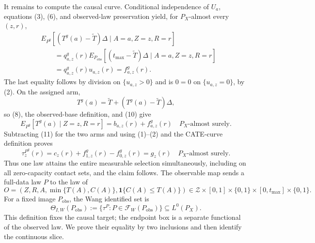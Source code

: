 It remains to compute the causal curve.  Conditional independence of \(U_a\), equations (3), (6), and observed-law preservation yield, for \(P_X\)-almost every \((z,r)\),
\[
\begin{aligned}
&E_{P^g}\!\left[(T^g(a)-\widetilde T)\Delta
\mid A=a,Z=z,R=r\right]\\
&\qquad=q^g_{a,z}(r)
E_{P_{\mathrm{obs}}}\!\left[(t_{\max}-\widetilde T)\Delta
\mid A=a,Z=z,R=r\right]\\
&\qquad=q^g_{a,z}(r)u_{a,z}(r)
=f^g_{a,z}(r).
\end{aligned}
\tag{10}
\]
The last equality follows by division on \(\{u_{a,z}>0\}\) and is \(0=0\) on \(\{u_{a,z}=0\}\), by (2).  On the assigned arm,
\[
T^g(a)=\widetilde T+(T^g(a)-\widetilde T)\Delta,
\]
so (8), the observed-base definition, and (10) give
\[
E_{P^g}[T^g(a)\mid Z=z,R=r]
=b_{a,z}(r)+f^g_{a,z}(r)
\quad P_X\text{-almost surely}.
\tag{11}
\]
Subtracting (11) for the two arms and using (1)--(2) and the CATE-curve definition proves
\[
\tau_z^{P^g}(r)
=c_z(r)+f^g_{1,z}(r)-f^g_{0,z}(r)
=g_z(r)
\quad P_X\text{-almost surely}.
\tag{12}
\]
Thus one law attains the entire measurable selection simultaneously, including on all zero-capacity contact sets, and the claim follows.
The observable map sends a full-data law \(P\) to the law of
\[
O=(Z,R,A,\min\{T(A),C(A)\},\mathbf 1\{C(A)\le T(A)\})
\in\mathcal Z\times[0,1]\times\{0,1\}\times[0,t_{\max}]\times\{0,1\}.
\]
For a fixed image \(P_{\mathrm{obs}}\), the Wang identified set is
\[
\Theta_{I,W}(P_{\mathrm{obs}})
:=\{\tau^P:P\in\mathcal F_W(P_{\mathrm{obs}})\}
\subseteq L^0(P_X).
\]
This definition fixes the causal target; the endpoint box is a separate functional of the observed law.  We prove their equality by two inclusions and then identify the continuous slice.

